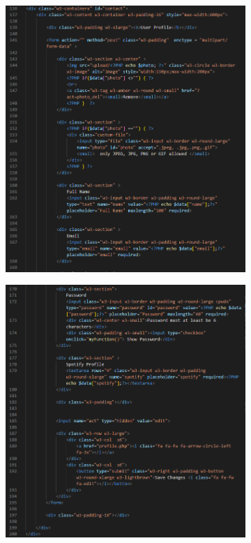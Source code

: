 \begin{enumerate}[1.]
\begin{figure}[h]
\begin{subfigure}[b]{0.7\textwidth}
            \includegraphics[width=\textwidth]{mainmatter/images/frontend/code/editprofile.png}
            \label{fig:sub1}
        \end{subfigure}
        \hspace{0.05\textwidth}
        \begin{subfigure}[b]{0.7\textwidth}
            \centering
            \includegraphics[width=\textwidth]{mainmatter/images/frontend/code/editprofile2.png}

\end{subfigure}
\end{figure}
\end{enumerate}
